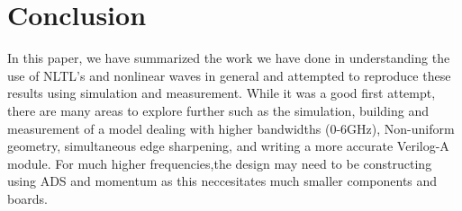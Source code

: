 \documentclass[journal]{IEEEtran} \usepackage[english]{babel}
\begin{document}
\section{ Conclusion} 

In this paper, we have summarized the work we have done in understanding the use
of NLTL's and nonlinear waves in general and attempted to reproduce these
results using simulation and measurement. While it was a good first attempt,
there are many areas to explore further such as the simulation, building and
measurement of a model dealing with higher bandwidths (0-6GHz), Non-uniform
geometry, simultaneous edge sharpening, and writing a more accurate Verilog-A
module. For much higher frequencies,the design may need to be constructing using
ADS and momentum as this neccesitates much smaller components and boards. 












 
 
 
 
 
 
 
 
 
 
 
 
 










\end{document}
